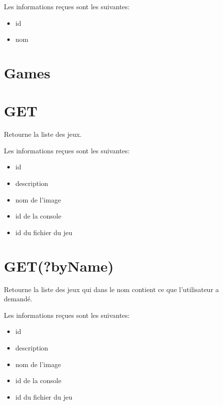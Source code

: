 \documentclass[a4paper,12pt,french]{sphinxmanual}
\begin{document}
\sphinxAtStartPar
Les informations reçues sont les suivantes:
\begin{itemize}
\item {} 
\sphinxAtStartPar
id

\item {} 
\sphinxAtStartPar
nom

\end{itemize}


\section{Games}
\label{\detokenize{fonctionnelleAPI:games}}

\section{GET}
\label{\detokenize{fonctionnelleAPI:id1}}
\sphinxAtStartPar
Retourne la liste des jeux.

\sphinxAtStartPar
Les informations reçues sont les suivantes:
\begin{itemize}
\item {} 
\sphinxAtStartPar
id

\item {} 
\sphinxAtStartPar
description

\item {} 
\sphinxAtStartPar
nom de l’image

\item {} 
\sphinxAtStartPar
id de la console

\item {} 
\sphinxAtStartPar
id du fichier du jeu

\end{itemize}


\section{GET(?byName)}
\label{\detokenize{fonctionnelleAPI:get-byname}}
\sphinxAtStartPar
Retourne la liste des jeux qui dans le nom contient ce que l’utilisateur a demandé.

\sphinxAtStartPar
Les informations reçues sont les suivantes:
\begin{itemize}
\item {} 
\sphinxAtStartPar
id

\item {} 
\sphinxAtStartPar
description

\item {} 
\sphinxAtStartPar
nom de l’image

\item {} 
\sphinxAtStartPar
id de la console

\item {} 
\sphinxAtStartPar
id du fichier du jeu

\end{itemize}
\end{document}
